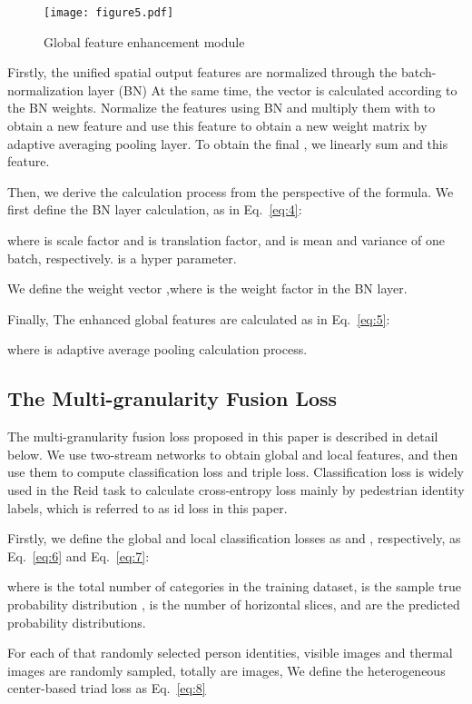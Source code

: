 \documentclass[journal]{IEEEtran}
\begin{document}
	\begin{figure}[!t]
		\centering
		\texttt{[image: figure5.pdf]}
		\vspace{-.05in}
		\caption{Global feature enhancement module}
		\label{fig5}
	\end{figure}
Firstly, the unified spatial output features  are normalized through the batch-normalization layer (BN) At the same time, the vector  is calculated according to the BN weights. Normalize the features  using BN and multiply them with  to obtain a new feature and use this feature to obtain a new weight matrix by adaptive averaging pooling layer. To obtain the final , we linearly sum  and this feature.

Then, we derive the calculation process from the perspective of the formula. We first define the BN layer calculation, as in Eq.~\ref{eq:4}:

where  is scale factor and  is translation factor,  and  is mean and variance of one batch, respectively.  is a hyper parameter.

We define the weight vector ,where is the weight factor in the BN layer.

Finally, The enhanced global features are calculated as in Eq.~\ref{eq:5}:

where  is adaptive average pooling calculation process. 
\subsection{The Multi-granularity Fusion Loss}
The multi-granularity fusion loss proposed in this paper is described in detail below. We use two-stream networks to obtain global and local features, and then use them to compute classification loss and triple loss. Classification loss is widely used in the Reid task to calculate cross-entropy loss mainly by pedestrian identity labels, which is referred to as id loss in this paper. 

Firstly, we define the global and local classification losses as  and  , respectively, as Eq.~\ref{eq:6} and Eq.~\ref{eq:7}:


where  is the total number of categories in the training dataset,  is the sample true probability distribution ,  is the number of horizontal slices,  and  are the predicted probability distributions.

For each of  that randomly selected person identities,  visible images and  thermal images are randomly sampled, totally are  images, We define the heterogeneous center-based triad loss as Eq.~\ref{eq:8}
\end{document}
